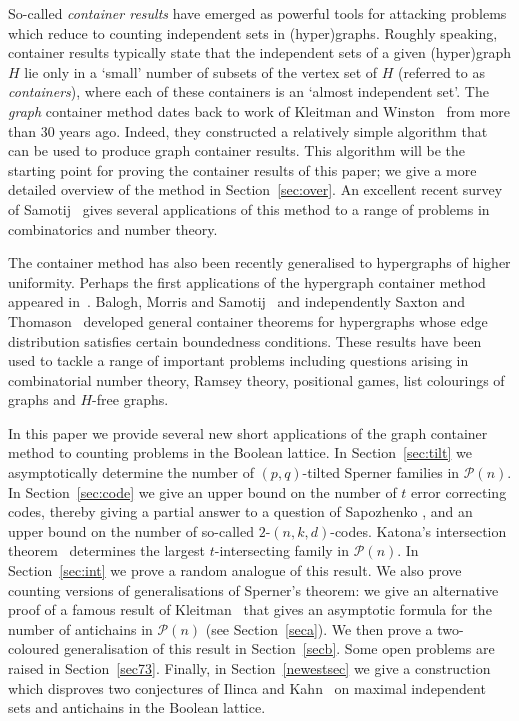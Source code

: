 \documentclass[11pt]{article}
\numberwithin{equation}{section}
\def\COMMENT#1{}
\begin{document}
So-called \emph{container results} have  emerged as powerful tools for attacking problems which reduce to counting independent sets in (hyper)graphs. Roughly speaking, container results typically state that the independent sets of a given (hyper)graph $H$ lie only in a `small' number of subsets of the vertex set of $H$ (referred to as \emph{containers}), where each of these containers is an `almost independent set'. 
The \emph{graph} container method dates back to work of Kleitman and Winston~\cite{kw1, kw2} from more than 30 years ago. Indeed, they constructed a relatively simple algorithm that can be used to produce graph container results. 
This algorithm will be the starting point for proving the container results of this paper; we give a more detailed overview of the method in Section~\ref{sec:over}. 
An excellent recent survey of Samotij~\cite{samsurvey} gives several applications of this method to a range of problems in combinatorics and number theory.

The container method has also been  recently generalised to hypergraphs of higher uniformity. Perhaps the first applications of the hypergraph container method appeared in~\cite{bs2}.
Balogh, Morris and Samotij~\cite{container1} and independently Saxton and Thomason~\cite{container2} developed  general container theorems for hypergraphs whose edge distribution satisfies  certain boundedness conditions. 
These results have been used to tackle a range of  important problems including questions arising in combinatorial number theory, Ramsey theory,  positional games, list colourings of graphs and $H$-free graphs.

In this paper we provide several new short applications of the graph container method to counting problems in the Boolean lattice. 
In Section~\ref{sec:tilt} we asymptotically determine
the number of $(p,q)$-tilted Sperner families in $\mathcal P(n)$. 
In Section~\ref{sec:code} we give an upper bound on the number of $t$ error correcting codes, thereby giving a partial answer to a question of Sapozhenko \cite{saponew},  and an upper bound on
the number of so-called $2$-$(n,k,d)$-codes. Katona's intersection theorem~\cite{katona} determines the largest $t$-intersecting family in $\mathcal P(n)$. In Section~\ref{sec:int} we prove a random analogue of this result. We also prove counting versions of 
generalisations of Sperner's theorem: we give an alternative proof of a famous result of Kleitman~\cite{kleitmansperner} that gives an asymptotic formula for the number of antichains in $\mathcal P(n)$ (see Section~\ref{seca}). 
We then prove a two-coloured generalisation of this result in Section~\ref{secb}.
Some open problems are raised in Section~\ref{sec73}. Finally, in Section~\ref{newestsec} we give a construction which disproves two conjectures of Ilinca and Kahn~\cite{IK} on maximal independent sets and antichains in the Boolean lattice.
\COMMENT{AT: tweaked this paragraph slightly}
\end{document}
